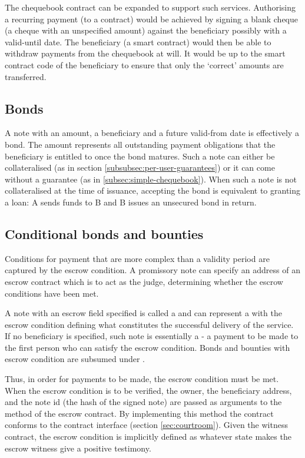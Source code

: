 The chequebook contract can be expanded to support such services. Authorising a recurring payment (to a contract) would be achieved by signing a blank cheque (a cheque with an unspecified amount) against the beneficiary possibly with a valid-until date. The beneficiary (a smart contract) would then be able to withdraw payments from the chequebook at will. It would be up to the smart contract code of the beneficiary to ensure that only the `correct' amounts are transferred. 

\subsection{Bonds}

A note with an amount, a beneficiary and a future valid-from date is effectively a bond. The amount represents all outstanding payment obligations that the beneficiary is entitled to once the bond matures. Such a note can either be collateralised (as in section \ref{subsubsec:per-user-guarantees}) or it can come without a guarantee (as in \ref{subsec:simple-chequebook}). When such a note is not collateralised at the time of issuance, accepting the bond is equivalent to granting a loan: A sends funds to B and B issues an unsecured bond in return.


\subsection{Conditional bonds and bounties}

Conditions for payment that are more complex than a validity period are captured by the escrow condition. A promissory note can specify an address of an escrow contract which is to act as the judge, determining whether the escrow conditions have been met.

A note with an escrow field specified is called a  and can represent a  with the escrow condition defining what constitutes the successful delivery of the service. 
If no beneficiary is specified, such note is essentially a  - a payment to be made to the first person who can satisfy the escrow condition. 
Bonds and bounties with escrow condition are subsumed under .

Thus, in order for payments to be made, the escrow condition must be met. When the escrow condition is to be verified, the owner, the beneficiary address, and the note id (the hash of the signed note) are passed as arguments to the  method of the escrow contract. By implementing this method the contract conforms to the  contract  interface (section \ref{sec:courtroom}). Given the witness contract, the escrow condition is implicitly defined as whatever state makes the escrow witness give a positive testimony. 


